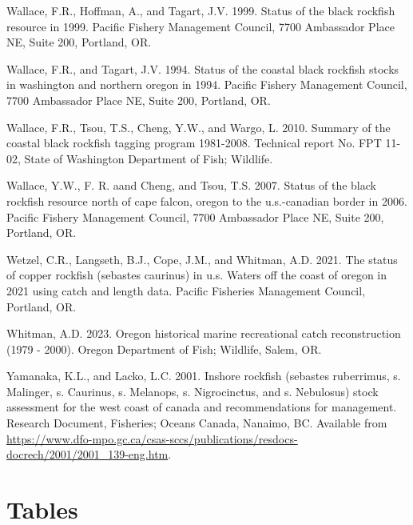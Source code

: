 \documentclass[11pt,
  letterpaper,
]{article}
\newlength{\cslhangindent}
\newenvironment{CSLReferences}[2] %
 {%
  \setlength{\parindent}{0pt}
  \ifodd #1 \everypar{\setlength{\hangindent}{\cslhangindent}}\ignorespaces\fi
  \ifnum #2 > 0
  \setlength{\parskip}{#2\baselineskip}
  \fi
 }%
 {}
\begin{document}
\begin{CSLReferences}{1}{0}
\leavevmode{}%
Wallace, F.R., Hoffman, A., and Tagart, J.V. 1999. Status of the black rockfish resource in 1999. Pacific Fishery Management Council, 7700 Ambassador Place NE, Suite 200, Portland, OR.

\leavevmode{}%
Wallace, F.R., and Tagart, J.V. 1994. Status of the coastal black rockfish stocks in washington and northern oregon in 1994. Pacific Fishery Management Council, 7700 Ambassador Place NE, Suite 200, Portland, OR.

\leavevmode{}%
Wallace, F.R., Tsou, T.S., Cheng, Y.W., and Wargo, L. 2010. Summary of the coastal black rockfish tagging program 1981-2008. Technical report No. FPT 11-02, State of Washington Department of Fish; Wildlife.

\leavevmode{}%
Wallace, Y.W., F. R. aand Cheng, and Tsou, T.S. 2007. Status of the black rockfish resource north of cape falcon, oregon to the u.s.-canadian border in 2006. Pacific Fishery Management Council, 7700 Ambassador Place NE, Suite 200, Portland, OR.

\leavevmode{}%
Wetzel, C.R., Langseth, B.J., Cope, J.M., and Whitman, A.D. 2021. The status of copper rockfish (sebastes caurinus) in u.s. Waters off the coast of oregon in 2021 using catch and length data. Pacific Fisheries Management Council, Portland, {OR}.

\leavevmode{}%
Whitman, A.D. 2023. Oregon historical marine recreational catch reconstruction (1979 - 2000). Oregon Department of Fish; Wildlife, Salem, {OR}.

\leavevmode{}%
Yamanaka, K.L., and Lacko, L.C. 2001. Inshore rockfish (sebastes ruberrimus, s. Malinger, s. Caurinus, s. Melanops, s. Nigrocinctus, and s. Nebulosus) stock assessment for the west coast of canada and recommendations for management. Research Document, Fisheries; Oceans Canada, Nanaimo, {BC}. Available from \url{https://www.dfo-mpo.gc.ca/csas-sccs/publications/resdocs-docrech/2001/2001_139-eng.htm}.

\end{CSLReferences}

\clearpage

\hypertarget{tables}{%
\section{Tables}\label{tables}}
\end{document}
